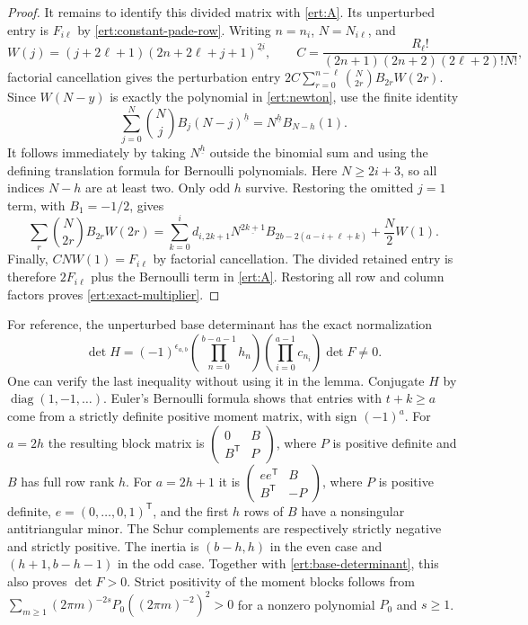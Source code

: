 \documentclass[11pt,a4paper]{article}
\numberwithin{equation}{section}
\theoremstyle{plain}
\theoremstyle{definition}
\theoremstyle{remark}
\begin{document}
\begin{proof}
It remains to identify this divided matrix with \eqref{ert:A}.
Its unperturbed entry is $F_{i\ell}$ by
\eqref{ert:constant-pade-row}. Writing $n=n_i$, $N=N_{i\ell}$,
and
\[
 W(j)=(j+2\ell+1)(2n+2\ell+j+1)^{\underline{2i}},\qquad
 C=\frac{R_\ell!}{(2n+1)(2n+2)(2\ell+2)!N!},
\]
factorial cancellation gives the perturbation entry
$2C\sum_{r=0}^{n-\ell}\binom N{2r}B_{2r}W(2r)$.
Since $W(N-y)$ is exactly the polynomial in \eqref{ert:newton},
use the finite identity
\[
 \sum_{j=0}^N\binom Nj B_j(N-j)^{\underline h}
    =N^{\underline h}B_{N-h}(1).
\]
It follows immediately by taking $N^{\underline h}$ outside
the binomial sum and using the defining translation formula for
Bernoulli polynomials. Here $N\ge2i+3$, so all indices $N-h$
are at least two. Only odd $h$ survive. Restoring the omitted
$j=1$ term, with $B_1=-1/2$, gives
\[
 \sum_r\binom N{2r}B_{2r}W(2r)
  =\sum_{k=0}^i d_{i,2k+1}N^{\underline{2k+1}}
           B_{2b-2(a-i+\ell+k)}+\frac N2W(1).
\]
Finally, $CNW(1)=F_{i\ell}$ by factorial cancellation. The divided
retained entry is therefore $2F_{i\ell}$ plus the Bernoulli term
in \eqref{ert:A}. Restoring all row and column factors proves
\eqref{ert:exact-multiplier}.
\end{proof}

For reference, the unperturbed base determinant has the exact
normalization
\begin{equation}\label{ert:base-determinant}
 \det H=(-1)^{\epsilon_{a,b}}
 \left(\prod_{n=0}^{b-a-1}h_n\right)
 \left(\prod_{i=0}^{a-1}c_{n_i}\right)\det F\ne0.
\end{equation}
One can verify the last inequality without using it in the lemma.
Conjugate $H$ by $\operatorname{diag}(1,-1,\ldots)$.
Euler's Bernoulli formula shows that entries with $t+k\ge a$
come from a strictly definite positive moment matrix,
with sign $(-1)^a$. For $a=2h$ the resulting block matrix is
$\left(\begin{smallmatrix}0&B\\B^{\mathsf T}&P\end{smallmatrix}\right)$,
where $P$ is positive definite and $B$ has full row rank $h$.
For $a=2h+1$ it is
$\left(\begin{smallmatrix}ee^{\mathsf T}&B\\B^{\mathsf T}&-P\end{smallmatrix}\right)$,
where $P$ is positive definite, $e=(0,\ldots,0,1)^{\mathsf T}$,
and the first $h$ rows of $B$ have a nonsingular antitriangular
minor. The Schur complements are respectively strictly negative
and strictly positive. The inertia is $(b-h,h)$ in the even case
and $(h+1,b-h-1)$ in the odd case. Together with
\eqref{ert:base-determinant}, this also proves $\det F>0$.
Strict positivity of the moment blocks follows from
$\sum_{m\ge1}(2\pi m)^{-2s}P_0((2\pi m)^{-2})^2>0$ for a
nonzero polynomial $P_0$ and $s\ge1$.
\end{document}
